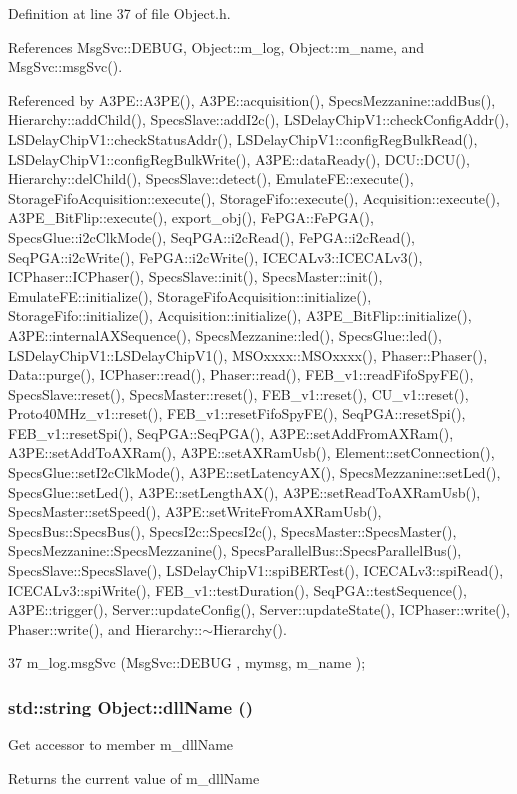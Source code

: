 Definition at line 37 of file Object.h.

References MsgSvc::DEBUG, Object::m\_\-log, Object::m\_\-name, and MsgSvc::msgSvc().

Referenced by A3PE::A3PE(), A3PE::acquisition(), SpecsMezzanine::addBus(), Hierarchy::addChild(), SpecsSlave::addI2c(), LSDelayChipV1::checkConfigAddr(), LSDelayChipV1::checkStatusAddr(), LSDelayChipV1::configRegBulkRead(), LSDelayChipV1::configRegBulkWrite(), A3PE::dataReady(), DCU::DCU(), Hierarchy::delChild(), SpecsSlave::detect(), EmulateFE::execute(), StorageFifoAcquisition::execute(), StorageFifo::execute(), Acquisition::execute(), A3PE\_\-BitFlip::execute(), export\_\-obj(), FePGA::FePGA(), SpecsGlue::i2cClkMode(), SeqPGA::i2cRead(), FePGA::i2cRead(), SeqPGA::i2cWrite(), FePGA::i2cWrite(), ICECALv3::ICECALv3(), ICPhaser::ICPhaser(), SpecsSlave::init(), SpecsMaster::init(), EmulateFE::initialize(), StorageFifoAcquisition::initialize(), StorageFifo::initialize(), Acquisition::initialize(), A3PE\_\-BitFlip::initialize(), A3PE::internalAXSequence(), SpecsMezzanine::led(), SpecsGlue::led(), LSDelayChipV1::LSDelayChipV1(), MSOxxxx::MSOxxxx(), Phaser::Phaser(), Data::purge(), ICPhaser::read(), Phaser::read(), FEB\_\-v1::readFifoSpyFE(), SpecsSlave::reset(), SpecsMaster::reset(), FEB\_\-v1::reset(), CU\_\-v1::reset(), Proto40MHz\_\-v1::reset(), FEB\_\-v1::resetFifoSpyFE(), SeqPGA::resetSpi(), FEB\_\-v1::resetSpi(), SeqPGA::SeqPGA(), A3PE::setAddFromAXRam(), A3PE::setAddToAXRam(), A3PE::setAXRamUsb(), Element::setConnection(), SpecsGlue::setI2cClkMode(), A3PE::setLatencyAX(), SpecsMezzanine::setLed(), SpecsGlue::setLed(), A3PE::setLengthAX(), A3PE::setReadToAXRamUsb(), SpecsMaster::setSpeed(), A3PE::setWriteFromAXRamUsb(), SpecsBus::SpecsBus(), SpecsI2c::SpecsI2c(), SpecsMaster::SpecsMaster(), SpecsMezzanine::SpecsMezzanine(), SpecsParallelBus::SpecsParallelBus(), SpecsSlave::SpecsSlave(), LSDelayChipV1::spiBERTest(), ICECALv3::spiRead(), ICECALv3::spiWrite(), FEB\_\-v1::testDuration(), SeqPGA::testSequence(), A3PE::trigger(), Server::updateConfig(), Server::updateState(), ICPhaser::write(), Phaser::write(), and Hierarchy::$\sim$Hierarchy().


\begin{DoxyCode}
37 { m_log.msgSvc (MsgSvc::DEBUG   , mymsg, m_name ); }
\end{DoxyCode}
\hypertarget{classObject_a2e3947f2870094c332d7454117f3ec63}{
\subsubsection[{dllName}]{\setlength{\rightskip}{0pt plus 5cm}std::string Object::dllName ()}}
\label{classObject_a2e3947f2870094c332d7454117f3ec63}
Get accessor to member m\_\-dllName \begin{DoxyReturn}{Returns}
the current value of m\_\-dllName 
\end{DoxyReturn}


